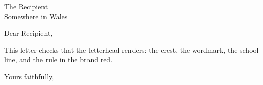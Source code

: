 \documentclass[a4paper,11pt]{letter}
\begin{document}
\begin{letter}{The Recipient\\Somewhere in Wales}
  \bangorletterhead
  \opening{Dear Recipient,}
  This letter checks that the letterhead renders: the crest, the
  wordmark, the school line, and the rule in the brand red.
  \closing{Yours faithfully,}
\end{letter}
\end{document}
